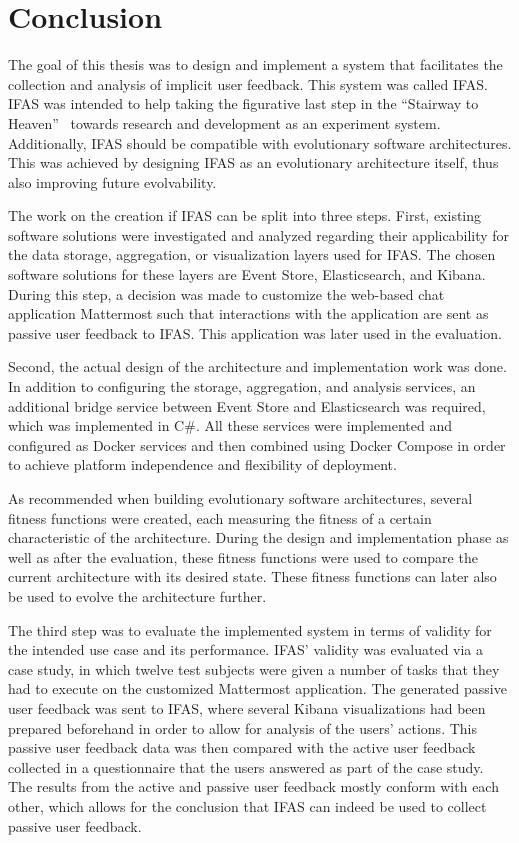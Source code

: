 %
\chapter{Conclusion}
\label{ch:conclusion}

The goal of this thesis was to design and implement a system that facilitates the collection and analysis of implicit user feedback.
This system was called \acf{IFAS}.
\ac{IFAS} was intended to help taking the figurative last step in the ``Stairway to Heaven''~\cite{Olsson2012} towards research and development as an experiment system.
Additionally, \ac{IFAS} should be compatible with evolutionary software architectures.
This was achieved by designing \ac{IFAS} as an evolutionary architecture itself, thus also improving future evolvability.

The work on the creation if \ac{IFAS} can be split into three steps.
First, existing software solutions were investigated and analyzed regarding their applicability for the data storage, aggregation, or visualization layers used for \ac{IFAS}.
The chosen software solutions for these layers are Event Store, Elasticsearch, and Kibana.
During this step, a decision was made to customize the web-based chat application Mattermost such that interactions with the application are sent as passive user feedback to \ac{IFAS}.
This application was later used in the evaluation.

Second, the actual design of the architecture and implementation work was done.
In addition to configuring the storage, aggregation, and analysis services, an additional bridge service between Event Store and Elasticsearch was required, which was implemented in C\#.
All these services were implemented and configured as Docker services and then combined using Docker Compose in order to achieve platform independence and flexibility of deployment.

As recommended when building evolutionary software architectures, several fitness functions were created, each measuring the fitness of a certain characteristic of the architecture.
During the design and implementation phase as well as after the evaluation, these fitness functions were used to compare the current architecture with its desired state.
These fitness functions can later also be used to evolve the architecture further.

The third step was to evaluate the implemented system in terms of validity for the intended use case and its performance.
\ac{IFAS}' validity was evaluated via a case study, in which twelve test subjects were given a number of tasks that they had to execute on the customized Mattermost application.
The generated passive user feedback was sent to \ac{IFAS}, where several Kibana visualizations had been prepared beforehand in order to allow for analysis of the users' actions.
This passive user feedback data was then compared with the active user feedback collected in a questionnaire that the users answered as part of the case study.
The results from the active and passive user feedback mostly conform with each other, which allows for the conclusion that \ac{IFAS} can indeed be used to collect passive user feedback.

